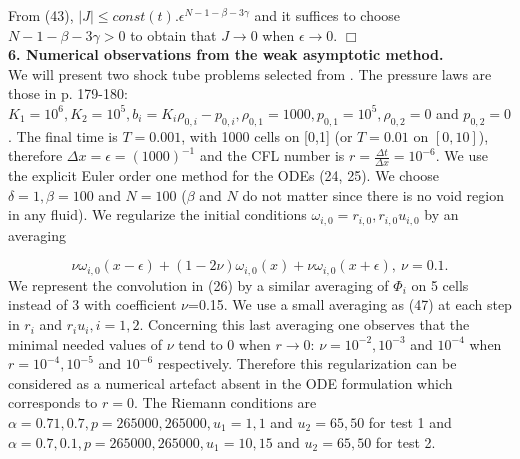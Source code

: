 \documentclass[a4paper,12pt]{article}
\begin{document}
  From (43),
  $|J|\leq const(t).\epsilon^{N-1-\beta-3\gamma}$  and  it suffices to choose $N-1-\beta-3\gamma>0$ 
  to obtain that $J\rightarrow 0$ when $\epsilon \rightarrow 0.$ $\Box$\\

% 





 

\textbf{6. Numerical observations from the weak asymptotic method.} \\
We will present two shock tube problems selected from \cite{EvjeFlatten}. The pressure laws are those in \cite{EvjeFlatten} p. 179-180: $K_1=10^6, K_2=10^5, b_i=K_i\rho_{0,i}-p_{0,i}, \rho_{0,1}=1000, p_{0,1}=10^5, \rho_{0,2}=0$ and  $p_{0,2}=0$. The final time is $T=0.001$, with 1000 cells on [0,1] (or $T=0.01$ on $[0,10]$), therefore $\Delta x=\epsilon=(1000)^{-1} $ and the CFL number is $r=\frac{\Delta t}{\Delta x}= 10^{-6}$. We use the explicit Euler order one method for the ODEs (24, 25). We choose  $\delta=1, \beta=100$ and $ N=100$ ($\beta$ and $N$ do not matter since there is no void region in any fluid). We regularize the initial conditions $\omega_{i,0}=r_{i,0}, r_{i,0}u_{i,0}$ by an averaging

 \begin{equation}\nu \omega_{i,0}(x-\epsilon)+(1-2\nu)\omega_{i,0}(x)+\nu\omega_{i,0}(x+\epsilon), \
 \nu=0.1.\end{equation}  
We represent the convolution   in (26) by a similar averaging of  $\Phi_i$ on 5 cells instead of 3 with coefficient $\nu$=0.15. We use a small averaging as (47) at each step in $r_i$ and $r_i u_i, i=1,2$. Concerning this last averaging one observes that the minimal needed values of $\nu$ tend to 0 when $r\rightarrow 0$: $\nu=10^{-2}, 10^{-3}$ and $ 10^{-4}$ when $r=10^{-4}, 10^{-5}$ and $ 10^{-6}$ respectively. Therefore this regularization can be considered as a numerical artefact absent in the ODE formulation which corresponds to $r=0$. 
The Riemann conditions are $\alpha=0.71,0.7,    p=265000,265000,   u_1=1,1$ and  $u_2=65,50$  for test 1 and $\alpha=0.7,0.1,    p=265000,265000,   u_1=10,15$ and  $ u_2=65,50$  for test 2.\\
\end{document}
